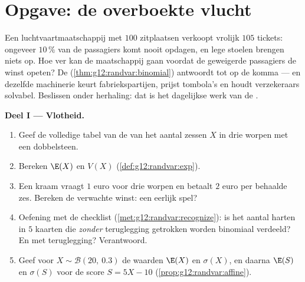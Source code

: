 \section{Opgave: de overboekte vlucht}

\begin{problem}
\label{pb:g12:randvar:1}
Een luchtvaartmaatschappij met $100$ zitplaatsen verkoopt vrolijk $105$
tickets: ongeveer $10\,\%$ van de passagiers komt nooit opdagen, en lege
stoelen brengen niets op. Hoe ver kan de maatschappij gaan voordat de
geweigerde passagiers de winst opeten? De 
(\cref{thm:g12:randvar:binomial}) antwoordt tot op de komma --- en dezelfde
machinerie keurt fabriekspartijen, prijst tombola's en houdt verzekeraars
solvabel. Beslissen onder herhaling: dat is het dagelijkse werk van de
.

\medskip
\noindent\textbf{Deel I --- Vlotheid.}
\begin{enumerate}
  \item Geef de volledige tabel van de  van het aantal zessen $X$
        in drie worpen met een dobbelsteen.
  \item Bereken $\E(X)$ en $V(X)$ (\cref{def:g12:randvar:exp}).
  \item Een kraam vraagt $1$ euro voor drie worpen en betaalt $2$ euro per
        behaalde zes. Bereken de verwachte winst: een eerlijk spel?
  \item Oefening met de checklist (\cref{met:g12:randvar:recognize}): is het
        aantal harten in $5$ kaarten die \emph{zonder} teruglegging getrokken
        worden binomiaal verdeeld? En met teruglegging? Verantwoord.
  \item Geef voor $X \sim \mathcal B(20,\ 0.3)$ de waarden $\E(X)$ en
        $\sigma(X)$, en daarna $\E(S)$ en $\sigma(S)$ voor de score
        $S = 5X - 10$ (\cref{prop:g12:randvar:affine}).
\end{enumerate}


\end{problem}
